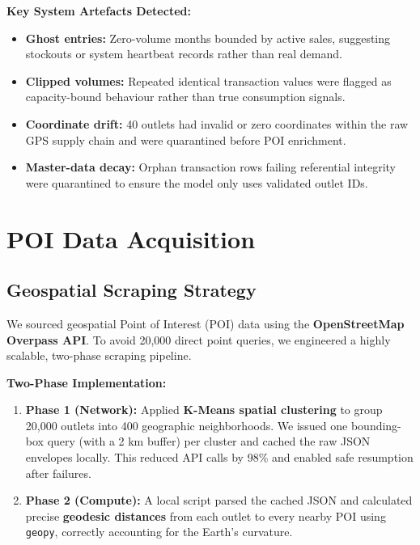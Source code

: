 \documentclass[11pt, a4paper]{article}
\begin{document}
\textbf{Key System Artefacts Detected:}
\begin{itemize}[noitemsep, topsep=2pt]
  \item \textbf{Ghost entries:} Zero-volume months bounded by active sales,
        suggesting stockouts or system heartbeat records rather than real demand.
  \item \textbf{Clipped volumes:} Repeated identical transaction values were flagged
        as capacity-bound behaviour rather than true consumption signals.
  \item \textbf{Coordinate drift:} 40 outlets had invalid or zero coordinates within
        the raw GPS supply chain and were quarantined before POI enrichment.
  \item \textbf{Master-data decay:} Orphan transaction rows failing referential
        integrity were quarantined to ensure the model only uses validated outlet IDs.
\end{itemize}

\newpage


\section{POI Data Acquisition}

\subsection{Geospatial Scraping Strategy}

We sourced geospatial Point of Interest (POI) data using the
\textbf{OpenStreetMap Overpass API}. To avoid 20,000 direct point queries, we
engineered a highly scalable, two-phase scraping pipeline.

\textbf{Two-Phase Implementation:}
\begin{enumerate}[noitemsep, topsep=2pt]
  \item \textbf{Phase 1 (Network):} Applied \textbf{K-Means spatial clustering} to group
        20,000 outlets into 400 geographic neighborhoods. We issued one
        bounding-box query (with a 2 km buffer) per cluster and cached the raw
        JSON envelopes locally. This reduced API calls by 98\% and enabled
        safe resumption after failures.
  \item \textbf{Phase 2 (Compute):} A local script parsed the cached JSON and
        calculated precise \textbf{geodesic distances} from each outlet to every
        nearby POI using \texttt{geopy}, correctly accounting for the Earth's
        curvature.
\end{enumerate}
\end{document}
